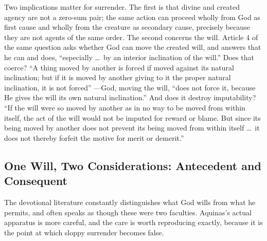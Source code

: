 Two implications matter for surrender. The first is that divine and created agency are not a zero-sum pair; the same action can proceed wholly from God as first cause and wholly from the creature as secondary cause, precisely because they are not agents of the same order. The second concerns the will. Article 4 of the same question asks whether God can move the created will, and answers that he can and does, ``especially \ldots\ by an interior inclination of the will.'' Does that coerce? ``A thing moved by another is forced if moved against its natural inclination; but if it is moved by another giving to it the proper natural inclination, it is not forced'' ---God, moving the will, ``does not force it, because He gives the will its own natural inclination.'' And does it destroy imputability? ``If the will were so moved by another as in no way to be moved from within itself, the act of the will would not be imputed for reward or blame. But since its being moved by another does not prevent its being moved from within itself \ldots\ it does not thereby forfeit the motive for merit or demerit.''

\subsection{One Will, Two Considerations: Antecedent and Consequent}

The devotional literature constantly distinguishes what God wills from what he permits, and often speaks as though these were two faculties. Aquinas's actual apparatus is more careful, and the care is worth reproducing exactly, because it is the point at which sloppy surrender becomes false.

